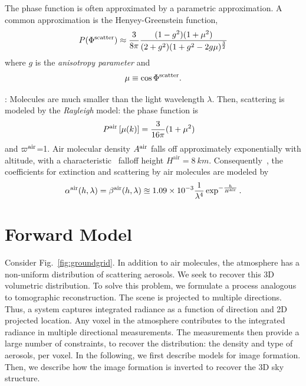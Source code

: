 \documentclass[10pt,twocolumn,letterpaper]{article}
\begin{document}
The phase function is often approximated by a parametric approximation. A common approximation is
the Henyey-Greenstein function,
\begin{align}
  P(\Phi^{\rm scatter})\approx
   \frac{3} {8\pi}
   \frac{(1 - g^2)(1+\mu^2)}
        {(2+g^2)(1 + g^2 - 2g\mu)^\frac{3}{2}}
  \label{eq:aerosol_scatter}
\end{align}
where $g$ is the {\em anisotropy parameter} and
\begin{align}
  \mu\equiv \cos \Phi^{\rm scatter}.
\end{align}

: Molecules are much smaller than the light wavelength $\lambda$. Then, scattering is modeled by the {\em Rayleigh} model: the phase function is
\begin{align}
  P^{\rm air}\left[\mu(k)\right] &= \frac{3}{16\pi}(1+\mu^2)
  \label{eq:rayleighP}
\end{align}
and $\varpi^{\rm air}$=1. Air molecular density $A^{\rm air}$ falls off approximately exponentially with altitude, with
a characteristic~\cite{Levi1980} falloff height $H^\mathrm{air}=8\ km$. Consequently~\cite{Levi1980},
the coefficients for extinction and scattering by air molecules are modeled by
\begin{align}
  \alpha^{\rm air}(h, \lambda)=\beta^{\rm air}(h, \lambda)
  \approxeq 1.09 \times 10^{-3}
  \frac{1}{\lambda^4}\exp^{-\frac{h}{H^\mathrm{air}}}.
  \label{eq:rayleighbeta}
\end{align}






\section{Forward Model}
\label{sec:skymodel} \vspace{-0.2cm}

Consider Fig.~\ref{fig:groundgrid}. In addition to air molecules, the atmosphere has a non-uniform distribution of scattering aerosols. We seek to recover this 3D volumetric distribution. To solve this problem, we formulate a process analogous to tomographic reconstruction. The scene is projected to multiple directions. Thus, a system captures integrated radiance as a function of direction and 2D projected location. Any voxel in the atmosphere contributes to the integrated radiance in multiple directional measurements. The measurements then provide a large number of constraints, to recover the distribution: the density and type of aerosols, per voxel. In the following, we first describe models for image formation. Then, we describe how the image formation is inverted to recover the 3D sky structure.
\end{document}
